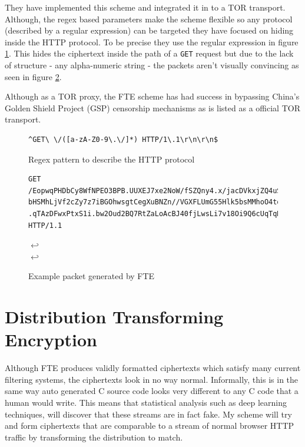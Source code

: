 \documentclass[ %
                    author={Samuel Russell},
                supervisor={Prof. Bogdan Warinschi},
                    degree={MEng},
                     title={Innocuous Ciphertexts},
                  subtitle={The DE-CENSOR Scheme},
                      type={research},
                      year={2018} ]{dissertation}
\begin{document}
They have implemented this scheme and integrated it in to a TOR transport. Although, the regex based parameters make the scheme flexible so any protocol (described by a regular expression) can be targeted they have focused on hiding inside the HTTP protocol. To be precise they use the regular expression in figure \ref{fig:http-regex}. This hides the ciphertext inside the path of a \texttt{GET} request but due to the lack of structure - any alpha-numeric string - the packets aren't visually convincing as seen in figure \ref{fig:http-ex}.

Although as a TOR proxy, the FTE scheme has had success in bypassing China's Golden Shield Project (GSP) censorship mechanisms as is listed as a official TOR transport.

\begin{figure}[h]
\begin{verbatim}
^GET\ \/([a-zA-Z0-9\.\/]*) HTTP/1\.1\r\n\r\n$
\end{verbatim}
\caption{Regex pattern to describe the HTTP protocol}
\label{fig:http-regex}
\end{figure}


\begin{figure}[h]
\begin{verbatim}
GET /EopwqPHDbCy8WfNPEO3BPB.UUXEJ7xe2NoW/fSZQny4.x/jacDVkxjZQ4uSqgZu7.N2AGbaYeFqr/DEh
bHSMhLjVf2cZy7z7iBGOhwsgtCegXuBNZn//VGXFLUmG55Hlk5bsMMhoO4tqF.mYApGxAd2c0G/goOnZLivQB
.qTAzDFwxPtxS1i.bw2Oud2BQ7RtZaLoAcBJ40fjLwsLi7v18Oi9Q6cUqTqHKTMsVWijB9/kh HTTP/1.1
\end{verbatim}
$\hookleftarrow$\\
$\hookleftarrow$
\caption{Example packet generated by FTE}
\label{fig:http-ex}
\end{figure}




\section{Distribution Transforming Encryption}

Although FTE produces validly formatted ciphertexts which satisfy many current filtering systems, the ciphertexts look in no way normal.
Informally, this is in the same way auto generated C source code looks very different to any C code that a human would write.
This means that statistical analysis such as deep learning techniques, will discover that these streams are in fact fake.
My scheme will try and form ciphertexts that are comparable to a stream of normal browser HTTP traffic by transforming the distribution to match. 
\end{document}

